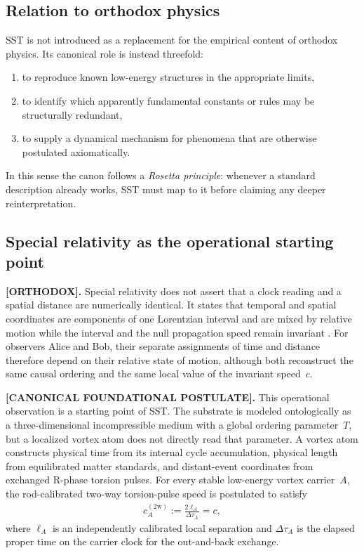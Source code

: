 \documentclass[11pt]{article}
\theoremstyle{definition}
\theoremstyle{plain}
\theoremstyle{remark}
\begin{document}
    \subsection{Relation to orthodox physics}
        SST is not introduced as a replacement for the empirical content of orthodox physics. Its canonical role is instead threefold:
        \begin{enumerate}
            \item to reproduce known low-energy structures in the appropriate limits,
            \item to identify which apparently fundamental constants or rules may be structurally redundant,
            \item to supply a dynamical mechanism for phenomena that are otherwise postulated axiomatically.
        \end{enumerate}
        In this sense the canon follows a \emph{Rosetta principle}: whenever a standard description already works, SST must map to it before claiming any deeper reinterpretation.

    \subsection{Special relativity as the operational starting point}
        \label{subsec:sr_operational_origin}

        \textbf{[ORTHODOX].}
        Special relativity does not assert that a clock reading and a spatial distance are numerically identical. It states that temporal and spatial coordinates are components of one Lorentzian interval and are mixed by relative motion while the interval and the null propagation speed remain invariant \cite{Einstein1905}. For observers Alice and Bob, their separate assignments of time and distance therefore depend on their relative state of motion, although both reconstruct the same causal ordering and the same local value of the invariant speed~\(c\).

        \textbf{[CANONICAL FOUNDATIONAL POSTULATE].}
        This operational observation is a starting point of SST. The substrate is modeled ontologically as a three-dimensional incompressible medium with a global ordering parameter~\(T\), but a localized vortex atom does not directly read that parameter. A vortex atom constructs physical time from its internal cycle accumulation, physical length from equilibrated matter standards, and distant-event coordinates from exchanged R-phase torsion pulses. For every stable low-energy vortex carrier~\(A\), the rod-calibrated two-way torsion-pulse speed is postulated to satisfy
        \begin{align}
            c_A^{(2\mathrm w)}
            :=
            \frac{2\ell_A}{\Delta\tau_A}
            = c,
            \label{eq:foundational_vortex_atom_two_way_c}
        \end{align}
        where \(\ell_A\) is an independently calibrated local separation and \(\Delta\tau_A\) is the elapsed proper time on the carrier clock for the out-and-back exchange.
\end{document}
